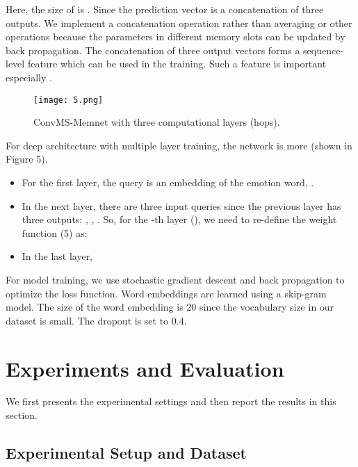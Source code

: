 \documentclass[11pt,letterpaper]{article}
\begin{document}
\begin{CJK*}{UTF8}{gbsn}
Here, the size of  is . Since the prediction vector is a concatenation of three outputs. We implement a concatenation operation rather than averaging or other operations because the parameters in different memory slots can be updated  by back propagation. The concatenation of three output vectors forms a sequence-level feature which can be used in the training. Such a feature is important especially .


\begin{figure}[htbp]
\label{fig:figure5}
\texttt{[image: 5.png]}
\caption{ConvMS-Memnet with three computational layers (hops).}
\end{figure}

For deep architecture with multiple layer training, the network is more 
(shown in Figure 5). 

\begin{itemize}
\item For the first layer, the query is an embedding of the emotion word, .
\item In the next layer, there are three input queries since the previous layer has three outputs: , , . So, for the -th layer (), we need to re-define the weight function (5) as:
\end{itemize}



\begin{itemize}
\item In the last layer, 
\end{itemize}

For model training, we use stochastic gradient descent and back propagation to optimize the loss function. Word embeddings are learned using a skip-gram model. The size of the word embedding is 20 since the vocabulary size in our dataset is small. The dropout is set to 0.4.

\section{Experiments and Evaluation}
\label{sec:section4}

We first presents the experimental settings and then report the results in this section.

\subsection{Experimental Setup and Dataset}


\end{CJK*}
\end{document}
